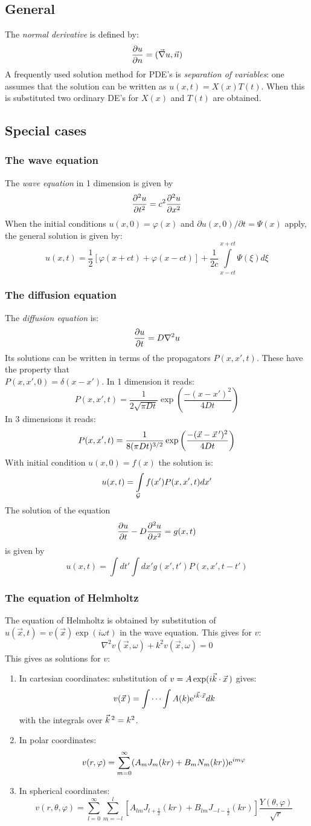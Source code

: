 \documentclass[a4paper,fancyheadings,twoside]{report}
\begin{document}
\subsection{General}
The {\it normal derivative} is defined by:
\[
\frac{\partial u}{\partial n}=(\vec{\nabla}u,\vec{n})
\]
A frequently used solution method for PDE's is {\it separation of variables}:
one assumes that the solution can be written as $u(x,t)=X(x)T(t)$. When this
is substituted two ordinary DE's for $X(x)$ and $T(t)$ are obtained.

\subsection{Special cases}
\subsubsection{The wave equation}
The {\it wave equation} in 1 dimension is given by
\[
\frac{\partial^2 u}{\partial t^2}=c^2\frac{\partial^2 u}{\partial x^2}
\]
When the initial conditions $u(x,0)=\varphi(x)$ and
$\partial u(x,0)/\partial t=\Psi(x)$ apply, the general solution is given by:
\[
u(x,t)=\frac{1}{2}\left[\varphi(x+ct)+\varphi(x-ct)\right]+\frac{1}{2c}
\int\limits_{x-ct}^{x+ct}\Psi(\xi)d\xi
\]

\subsubsection{The diffusion equation}
The {\it diffusion equation} is:
\[
\frac{\partial u}{\partial t}=D\nabla^2u
\]
Its solutions can be written in terms of the propagators $P(x,x',t)$. These
have the property that\\ $P(x,x',0)=\delta(x-x')$. In 1 dimension it reads:
\[
P(x,x',t)=\frac{1}{2\sqrt{\pi Dt}}\exp\left(\frac{-(x-x')^2}{4Dt}\right)
\]
In 3 dimensions it reads:
\[
P(x,x',t)=\frac{1}{8(\pi Dt)^{3/2}}\exp\left(\frac{-(\vec{x}-\vec{x}\,')^2}{4Dt}\right)
\]
With initial condition $u(x,0)=f(x)$ the solution is:
\[
u(x,t)=\int\limits_{\cal G}f(x')P(x,x',t)dx'
\]
The solution of the equation
\[
\frac{\partial u}{\partial t}-D\frac{\partial^2 u}{\partial x^2}=g(x,t)
\]
is given by
\[
u(x,t)=\int dt' \int dx'g(x',t')P(x,x',t-t')
\]

\subsubsection{The equation of Helmholtz}
The equation of Helmholtz is obtained by substitution of
$u(\vec{x},t)=v(\vec{x})\exp(i\omega t)$ in the wave equation. This gives
for $v$:
\[
\nabla^2v(\vec{x},\omega)+k^2v(\vec{x},\omega)=0
\]
This gives as solutions for $v$:
\begin{enumerate}
\item In cartesian coordinates: substitution of
$v=A\exp(i\vec{k}\cdot\vec{x}\,)$ gives:
\[
v(\vec{x}\,)=\int\cdots\int A(k){\rm e}^{i\vec{k}\cdot\vec{x}}dk
\]
with the integrals over $\vec{k}\,^2=k^2$.
\item In polar coordinates:
\[
v(r,\varphi)=\sum_{m=0}^\infty(A_mJ_m(kr)+B_mN_m(kr)){\rm e}^{im\varphi}
\]
\item In spherical coordinates:
\[
v(r,\theta,\varphi)=\sum_{l=0}^\infty\sum_{m=-l}^l[A_{lm}J_{l+\frac{1}{2}}(kr)+B_{lm}J_{-l-\frac{1}{2}}(kr)]\frac{Y(\theta,\varphi)}{\sqrt{r}}
\]
\end{enumerate}
\end{document}
